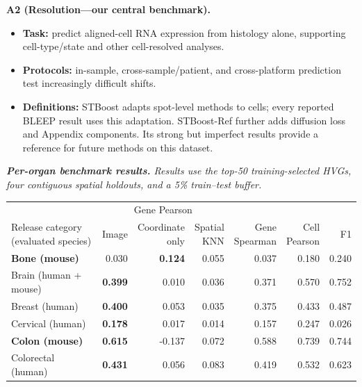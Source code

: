 \documentclass[10pt]{article}
\begin{document}
\textbf{A2 (Resolution---our central benchmark).}
\begin{itemize}
\item \textbf{Task:} predict aligned-cell RNA expression from histology alone,
supporting cell-type/state and other cell-resolved analyses.
\item \textbf{Protocols:} in-sample, cross-sample/patient, and cross-platform
prediction test increasingly difficult shifts.
\item \textbf{Definitions:} STBoost adapts spot-level methods to cells; every
reported BLEEP result uses this adaptation. STBoost-Ref further adds diffusion
loss and Appendix components. Its strong but imperfect results provide a
reference for future methods on this dataset.
\end{itemize}

\begin{center}
\begingroup
\footnotesize
\setlength{\tabcolsep}{4.2pt}
\renewcommand{\arraystretch}{1.04}
\textit{\textbf{Per-organ benchmark results.}
Results use the top-50 training-selected HVGs, four contiguous spatial
holdouts, and a 5\% train--test buffer.}\\[5pt]
\begin{tabular*}{\linewidth}{@{\extracolsep{\fill}}lrrrrrr@{}}
\toprule
\multicolumn{1}{c}{} & \multicolumn{3}{c}{Gene Pearson} & & & \\
\cmidrule(lr){2-4}
\shortstack[l]{Release category\\(evaluated species)} &
Image &
\shortstack{Coordinate\\only} &
\shortstack{Spatial\\KNN} &
\shortstack{Gene\\Spearman} &
\shortstack{Cell\\Pearson} &
F1 \\
\midrule
\textbf{Bone (mouse)} & 0.030 & \textbf{0.124} & 0.055 & 0.037 & 0.180 & 0.240 \\
Brain (human + mouse) & \textbf{0.399} & 0.010 & 0.036 & 0.371 & 0.570 & 0.752 \\
Breast (human) & \textbf{0.400} & 0.053 & 0.035 & 0.375 & 0.433 & 0.487 \\
Cervical (human) & \textbf{0.178} & 0.017 & 0.014 & 0.157 & 0.247 & 0.026 \\
\textbf{Colon (mouse)} & \textbf{0.615} & -0.137 & 0.072 & 0.588 & 0.739 & 0.744 \\
Colorectal (human) & \textbf{0.431} & 0.056 & 0.083 & 0.419 & 0.532 & 0.623 \\

\end{tabular*}
\end{center}
\end{document}
